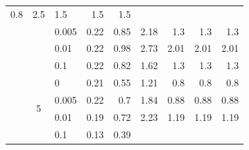 \begin{table}[htbp]
\begin{tabular}{|c|clrrrrrr|}
      \cellcolor[rgb]{ .855,  .894,  .58}0.8 &
      \cellcolor[rgb]{ .447,  .765,  .494}2.5 &
      \cellcolor[rgb]{ .686,  .839,  .545}1.5 &
      \cellcolor[rgb]{ .686,  .839,  .545}1.5 &
      \cellcolor[rgb]{ .686,  .839,  .545}1.5
      \\
     &
       &
      0.005 &
      \cellcolor[rgb]{ .992,  .937,  .612}0.22 &
      \cellcolor[rgb]{ .843,  .89,  .58}0.85 &
      \cellcolor[rgb]{ .522,  .788,  .514}2.18 &
      \cellcolor[rgb]{ .733,  .855,  .557}1.3 &
      \cellcolor[rgb]{ .733,  .855,  .557}1.3 &
      \cellcolor[rgb]{ .733,  .855,  .557}1.3
      \\
     &
       &
      0.01 &
      \cellcolor[rgb]{ .992,  .937,  .612}0.22 &
      \cellcolor[rgb]{ .812,  .878,  .573}0.98 &
      \cellcolor[rgb]{ .388,  .745,  .482}2.73 &
      \cellcolor[rgb]{ .565,  .8,  .522}2.01 &
      \cellcolor[rgb]{ .565,  .8,  .522}2.01 &
      \cellcolor[rgb]{ .565,  .8,  .522}2.01
      \\
     &
       &
      0.1 &
      \cellcolor[rgb]{ .992,  .937,  .612}0.22 &
      \cellcolor[rgb]{ .847,  .89,  .58}0.82 &
      \cellcolor[rgb]{ .655,  .831,  .541}1.62 &
      \cellcolor[rgb]{ .733,  .855,  .557}1.3 &
      \cellcolor[rgb]{ .733,  .855,  .557}1.3 &
      \cellcolor[rgb]{ .733,  .855,  .557}1.3
      \\
\cmidrule{2-9}     &
      \multirow{4}[2]{*}{5} &
      0 &
      \cellcolor[rgb]{ .98,  .933,  .608}0.21 &
      \cellcolor[rgb]{ .878,  .902,  .588}0.55 &
      \cellcolor[rgb]{ .686,  .839,  .549}1.21 &
      \cellcolor[rgb]{ .808,  .878,  .573}0.8 &
      \cellcolor[rgb]{ .808,  .878,  .573}0.8 &
      \cellcolor[rgb]{ .808,  .878,  .573}0.8
      \\
     &
       &
      0.005 &
      \cellcolor[rgb]{ .976,  .929,  .608}0.22 &
      \cellcolor[rgb]{ .835,  .886,  .58}0.7 &
      \cellcolor[rgb]{ .502,  .784,  .51}1.84 &
      \cellcolor[rgb]{ .784,  .871,  .569}0.88 &
      \cellcolor[rgb]{ .784,  .871,  .569}0.88 &
      \cellcolor[rgb]{ .784,  .871,  .569}0.88
      \\
     &
       &
      0.01 &
      \cellcolor[rgb]{ .984,  .933,  .612}0.19 &
      \cellcolor[rgb]{ .831,  .886,  .576}0.72 &
      \cellcolor[rgb]{ .388,  .745,  .482}2.23 &
      \cellcolor[rgb]{ .694,  .843,  .549}1.19 &
      \cellcolor[rgb]{ .694,  .843,  .549}1.19 &
      \cellcolor[rgb]{ .694,  .843,  .549}1.19
      \\
     &
       &
      0.1 &
      \cellcolor[rgb]{ 1,  .937,  .612}0.13 &
      \cellcolor[rgb]{ .925,  .914,  .596}0.39 &

\end{tabular}
\end{table}
